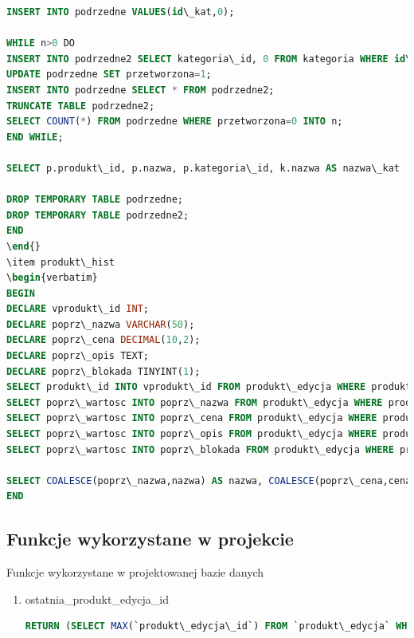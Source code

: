 \begin{enumerate}
\begin{lstlisting}[language=SQL]
INSERT INTO podrzedne VALUES(id\_kat,0);

WHILE n>0 DO
INSERT INTO podrzedne2 SELECT kategoria\_id, 0 FROM kategoria WHERE id\_nadrzednej IN (SELECT kategoria\_id FROM podrzedne WHERE przetworzona=0);
UPDATE podrzedne SET przetworzona=1;
INSERT INTO podrzedne SELECT * FROM podrzedne2;
TRUNCATE TABLE podrzedne2;
SELECT COUNT(*) FROM podrzedne WHERE przetworzona=0 INTO n;
END WHILE;

SELECT p.produkt\_id, p.nazwa, p.kategoria\_id, k.nazwa AS nazwa\_kat  FROM produkt p JOIN kategoria k USING(kategoria\_id) WHERE p.blokada=0 AND k.kategoria\_id IN (SELECT kategoria\_id FROM podrzedne);

DROP TEMPORARY TABLE podrzedne;
DROP TEMPORARY TABLE podrzedne2;
END
\end{}
\item produkt\_hist
\begin{verbatim}
BEGIN
DECLARE vprodukt\_id INT;
DECLARE poprz\_nazwa VARCHAR(50);
DECLARE poprz\_cena DECIMAL(10,2);
DECLARE poprz\_opis TEXT;
DECLARE poprz\_blokada TINYINT(1);
SELECT produkt\_id INTO vprodukt\_id FROM produkt\_edycja WHERE produkt\_edycja\_id=pprodukt\_edycja\_id;
SELECT poprz\_wartosc INTO poprz\_nazwa FROM produkt\_edycja WHERE produkt\_edycja\_id>pprodukt\_edycja\_id AND produkt\_id=vprodukt\_id AND kolumna='nazwa' ORDER BY produkt\_edycja\_id ASC LIMIT 1;
SELECT poprz\_wartosc INTO poprz\_cena FROM produkt\_edycja WHERE produkt\_edycja\_id>pprodukt\_edycja\_id AND produkt\_id=vprodukt\_id AND kolumna='cena' ORDER BY produkt\_edycja\_id ASC LIMIT 1;
SELECT poprz\_wartosc INTO poprz\_opis FROM produkt\_edycja WHERE produkt\_edycja\_id>pprodukt\_edycja\_id AND produkt\_id=vprodukt\_id AND kolumna='opis' ORDER BY produkt\_edycja\_id ASC LIMIT 1;
SELECT poprz\_wartosc INTO poprz\_blokada FROM produkt\_edycja WHERE produkt\_edycja\_id>pprodukt\_edycja\_id AND produkt\_id=vprodukt\_id AND kolumna='blokada' ORDER BY produkt\_edycja\_id ASC LIMIT 1;

SELECT COALESCE(poprz\_nazwa,nazwa) AS nazwa, COALESCE(poprz\_cena,cena) AS cena, COALESCE(poprz\_opis,opis) AS opis, COALESCE(poprz\_blokada,blokada) AS blokada FROM produkt WHERE produkt\_id=vprodukt\_id; 
END
\end{lstlisting}
\end{enumerate}
\subsection{Funkcje wykorzystane w projekcie}
Funkcje wykorzystane w projektowanej bazie danych

\begin{enumerate}
	\item ostatnia\_produkt\_edycja\_id
	\begin{lstlisting}[language=SQL]
	RETURN (SELECT MAX(`produkt\_edycja\_id`) FROM `produkt\_edycja` WHERE `produkt\_id`=produktid)
	\end{lstlisting}
\end{enumerate}

